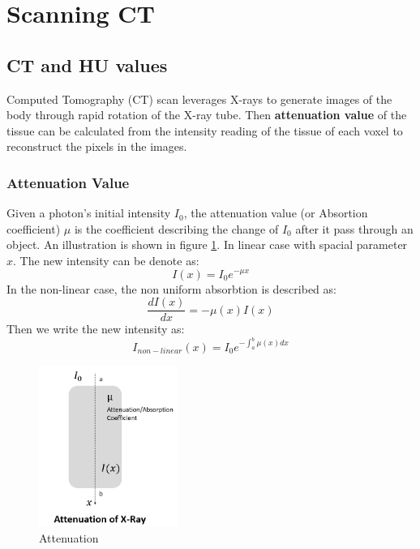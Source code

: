 \section{Scanning CT}

\subsection{CT and HU values}
Computed Tomography (CT) scan leverages X-rays to generate images of the body through rapid rotation of the X-ray tube. Then \textbf{attenuation value} of the tissue can be calculated from the intensity reading of the tissue of each voxel to reconstruct the pixels in the images.\\

\subsubsection{Attenuation Value}
Given a photon's initial intensity $I_{0}$, the attenuation value (or Absortion coefficient) $\mu$ is the coefficient describing the change of $I_{0}$ after it pass through an object. An illustration is shown in figure \ref{fig:attenutation}. In linear case with spacial parameter $x$. The new intensity can be denote as: $$I(x)=I_{0} e^{-\mu x}$$ In the non-linear case, the non uniform absorbtion is described as: $$\frac{d I(x)}{d x}=-\mu(x) I(x)$$ 
Then we write the new intensity as: $$I_{non-linear}(x)=I_{0} e^{-\int_{a}^{b} \mu(x) d x}$$

\begin{figure}[h]
	\centering
	\includegraphics[width=0.4\textwidth]{img/background_img/attenutation}
	\caption{Attenuation}
	\label{fig:attenutation}
\end{figure}

